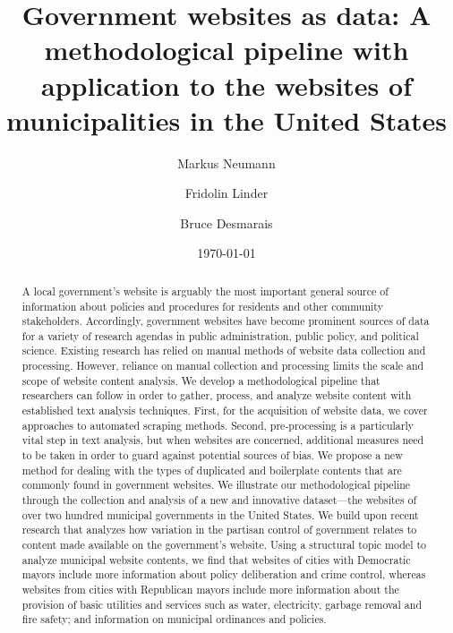 \documentclass[11pt]{article}
\title{\vspace{-2cm} Government websites as data: A methodological pipeline with application to the websites of municipalities in the United States}
\author{ Markus Neumann \and Fridolin Linder \and Bruce Desmarais} \date{\today}
\begin{document}
\maketitle




\begin{abstract}

A local government's website is arguably the most important general source of information about policies and procedures for residents and other community stakeholders. Accordingly, government websites have become prominent sources of data for a variety of research agendas in public administration, public policy, and political science. Existing research has relied on manual methods of website data collection and processing. However, reliance on manual collection and processing limits the scale and scope of website content analysis. We develop a methodological pipeline that researchers can follow in order to gather, process, and analyze website content with established text analysis techniques. First, for the acquisition of website data, we cover approaches to automated scraping methods. Second, pre-processing is a particularly vital step in text analysis, but when websites are concerned, additional measures need to be taken in order to guard against potential sources of bias. We propose a new method for dealing with the types of duplicated and boilerplate contents that are commonly found in government websites. We illustrate our methodological pipeline through the collection and analysis of a new and innovative dataset---the websites of over two hundred municipal governments in the United States. We build upon recent research that analyzes how variation in the partisan control of government relates to content made available on the government's website. Using a structural topic model to analyze municipal website contents, we find that websites of cities with Democratic mayors include more information about policy deliberation and crime control, whereas websites from cities with Republican mayors include more information about the provision of basic utilities and services such as water, electricity, garbage removal and fire safety; and information on municipal ordinances and policies.

\end{abstract}
\end{document}
